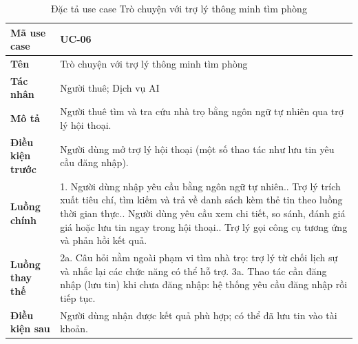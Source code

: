 \begin{table}[!ht]
\centering
\caption{Đặc tả use case Trò chuyện với trợ lý thông minh tìm phòng}
\label{tab:uc-aichat}
\begin{tabular}{p{} p{}}
\hline
\textbf{Mã use case} & UC-06 \\
\hline
\textbf{Tên} & Trò chuyện với trợ lý thông minh tìm phòng \\
\hline
\textbf{Tác nhân} & Người thuê; Dịch vụ AI \\
\hline
\textbf{Mô tả} & Người thuê tìm và tra cứu nhà trọ bằng ngôn ngữ tự nhiên qua trợ lý hội thoại. \\
\hline
\textbf{Điều kiện trước} & Người dùng mở trợ lý hội thoại (một số thao tác như lưu tin yêu cầu đăng nhập). \\
\hline
\textbf{Luồng chính} & 1. Người dùng nhập yêu cầu bằng ngôn ngữ tự nhiên.\newline
2. Trợ lý trích xuất tiêu chí, tìm kiếm và trả về danh sách kèm thẻ tin theo luồng thời gian thực.\newline
3. Người dùng yêu cầu xem chi tiết, so sánh, đánh giá giá hoặc lưu tin ngay trong hội thoại.\newline
4. Trợ lý gọi công cụ tương ứng và phản hồi kết quả. \\
\hline
\textbf{Luồng thay thế} & 2a. Câu hỏi nằm ngoài phạm vi tìm nhà trọ: trợ lý từ chối lịch sự và nhắc lại các chức năng có thể hỗ trợ.\newline
3a. Thao tác cần đăng nhập (lưu tin) khi chưa đăng nhập: hệ thống yêu cầu đăng nhập rồi tiếp tục. \\
\hline
\textbf{Điều kiện sau} & Người dùng nhận được kết quả phù hợp; có thể đã lưu tin vào tài khoản. \\
\hline
\end{tabular}
\end{table}
